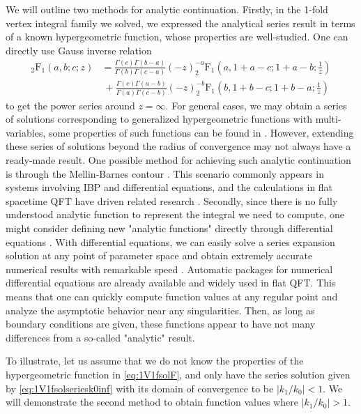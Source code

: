 \documentclass[a4paper,11pt]{article}
\newcommand{\nn}{\nonumber}
\begin{document}
We will outline two methods for analytic continuation.
Firstly, in the 1-fold vertex integral family we solved, we expressed the analytical series result in terms of a known hypergeometric function, whose properties are well-studied. One can directly use Gauss inverse relation
\begin{align}
_2\text{F}_1\left(a,b;c;z\right) &=  \frac{\Gamma(c)\Gamma(b-a)}{\Gamma(b)\Gamma(c-a)} (-z)^{-a} _2\text{F}_1\left(a,1+a-c;1+a-b;\frac{1}{z}\right) \nn\\
&~ + \frac{\Gamma(c)\Gamma(a-b)}{\Gamma(a)\Gamma(c-b)} (-z)^{-b} _2\text{F}_1\left(b,1+b-c;1+b-a;\frac{1}{z}\right) \,
\end{align}
to get the power series around $z=\infty$. For general cases, we may obtain a series of solutions corresponding to generalized hypergeometric functions with multi-variables, some properties of such functions can be found in \cite{Bailey1935GeneralizedHS,Slater1966GeneralizedHF,Exton1979HandbookOH,Exton1979MultipleHF,Srivastava1985MultipleGH}. However, extending these series of solutions beyond the radius of convergence may not always have a ready-made result. One possible method for achieving such analytic continuation is through the Mellin-Barnes contour \cite{barnes1908new,WhittakerACO}. This scenario commonly appears in systems involving IBP and differential equations, and the calculations in flat spacetime QFT have driven related research  \cite{Feng:2024xio}. Secondly, since there is no fully understood analytic function to represent the integral we need to compute, one might consider defining new "analytic functions" directly through differential equations \cite{Liu:2023jkr}. With differential equations, we can easily solve a series expansion solution at any point of parameter space and obtain extremely accurate numerical results with remarkable speed \cite{Moriello:2019yhu}. Automatic packages for numerical differential equations \cite{Hidding:2020ytt,Liu:2022chg} are already available and widely used in flat QFT.  This means that one can quickly compute function values at any regular point and analyze the asymptotic behavior near any singularities. Then, as long as boundary conditions are given, these functions appear to have not many differences from a so-called "analytic" result.

To illustrate, let us assume that we do not know the properties of the hypergeometric function in \eqref{eq:1V1fsolF}, and only have the series solution given by \eqref{eq:1V1fsolseriesk0inf} with its domain of convergence to be \(|k_1 / k_0| < 1\). We will demonstrate the second method to obtain function values where \(|k_1 / k_0| > 1\).
\end{document}
